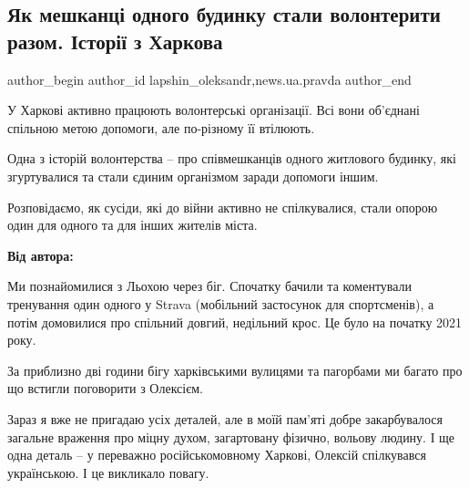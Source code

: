  
 
 
 
 
 
\subsection{Як мешканці одного будинку стали волонтерити разом. Історії з Харкова}
\label{sec:17_04_2022.stz.news.ua.pravda.2.budynok_volontery_istorii_harkov}
 
\ifcmt
 author_begin
   author_id lapshin_oleksandr,news.ua.pravda
 author_end
\fi


\begin{zznagolos}
У Харкові активно працюють волонтерські організації. Всі вони об'єднані
спільною метою допомоги, але по-різному її втілюють.

Одна з історій волонтерства – про співмешканців одного житлового будинку, які
згуртувалися та стали єдиним організмом заради допомоги іншим.

Розповідаємо, як сусіди, які до війни активно не спілкувалися, стали опорою
один для одного та для інших жителів міста.
\end{zznagolos}


\textbf{Від автора:}

Ми познайомилися з Льохою через біг. Спочатку бачили та коментували тренування
один одного у Strava (мобільний застосунок для спортсменів), а потім домовилися
про спільний довгий, недільний крос. Це було на початку 2021 року.


За приблизно дві години бігу харківськими вулицями та пагорбами ми багато про
що встигли поговорити з Олексієм.

Зараз я вже не пригадаю усіх деталей, але в моїй пам'яті добре закарбувалося
загальне враження про міцну духом, загартовану фізично, вольову людину. І ще
одна деталь – у переважно російськомовному Харкові, Олексій спілкувався
українською. І це викликало повагу.

